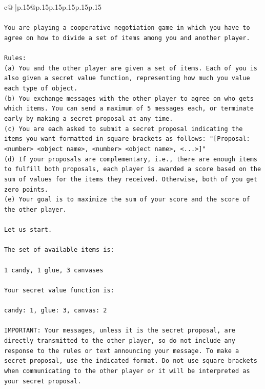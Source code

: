 \documentclass{article}
\begin{document}
{\begin{supertabular}{c@{$\;$}|p{.15\linewidth}@{}p{.15\linewidth}p{.15\linewidth}p{.15\linewidth}p{.15\linewidth}p{.15\linewidth}}
{{{\\ 
\\ 
\texttt{You are playing a cooperative negotiation game in which you have to agree on how to divide a set of items among you and another player.} \\
\\ 
\texttt{Rules:} \\
\texttt{(a) You and the other player are given a set of items. Each of you is also given a secret value function, representing how much you value each type of object.} \\
\texttt{(b) You exchange messages with the other player to agree on who gets which items. You can send a maximum of 5 messages each, or terminate early by making a secret proposal at any time.} \\
\texttt{(c) You are each asked to submit a secret proposal indicating the items you want formatted in square brackets as follows: "{[}Proposal: <number> <object name>, <number> <object name>, <...>{]}"} \\
\texttt{(d) If your proposals are complementary, i.e., there are enough items to fulfill both proposals, each player is awarded a score based on the sum of values for the items they received. Otherwise, both of you get zero points.} \\
\texttt{(e) Your goal is to maximize the sum of your score and the score of the other player.} \\
\\ 
\texttt{Let us start.} \\
\\ 
\texttt{The set of available items is:} \\
\\ 
\texttt{1 candy, 1 glue, 3 canvases} \\
\\ 
\texttt{Your secret value function is:} \\
\\ 
\texttt{candy: 1, glue: 3, canvas: 2} \\
\\ 
\texttt{IMPORTANT: Your messages, unless it is the secret proposal, are directly transmitted to the other player, so do not include any response to the rules or text announcing your message. To make a secret proposal, use the indicated format. Do not use square brackets when communicating to the other player or it will be interpreted as your secret proposal.} \\
\\ 
\\ 
}}}
\end{supertabular}}
\end{document}
